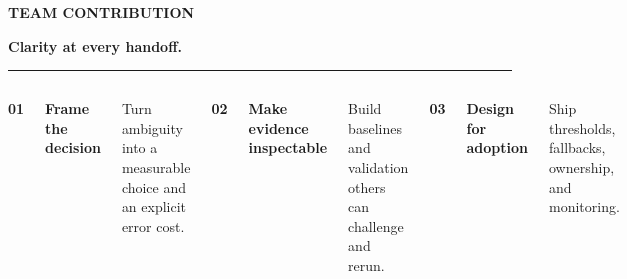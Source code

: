 \documentclass[aspectratio=169,11pt]{beamer}
\newcommand{\eyebrow}[1]{%
  {\fontsize{10}{12}\selectfont\bfseries\color{Leaf}\MakeUppercase{#1}\par}%
}
\newcommand{\slidetitle}[2]{%
  \eyebrow{#1}%
  \vspace{0.18cm}%
  {\fontsize{27}{29}\selectfont\bfseries\color{Ink}#2\par}%
  \vspace{0.12cm}%
  {\color{Mist}\rule{\textwidth}{0.65pt}}%
}
\newcommand{\smalltext}[1]{%
  {\fontsize{10.5}{13.5}\selectfont\color{Slate}#1\par}%
}
\begin{document}
\begin{frame}[t]
  \vspace{0.28cm}
  \slidetitle{Team contribution}{Clarity at every handoff.}
  \vspace{0.28cm}
  \begin{columns}[T,onlytextwidth]
      {\fontsize{23}{25}\selectfont\bfseries\color{Coral}01\par}
      \vspace{0.10cm}
      {\fontsize{16}{18}\selectfont\bfseries Frame the decision\par}
      \vspace{0.10cm}
      \smalltext{Turn ambiguity into a measurable choice and an explicit error cost.}
      \centering{\color{Mist}\rule{0.8pt}{2.80cm}}
      {\fontsize{23}{25}\selectfont\bfseries\color{Coral}02\par}
      \vspace{0.10cm}
      {\fontsize{16}{18}\selectfont\bfseries Make evidence inspectable\par}
      \vspace{0.10cm}
      \smalltext{Build baselines and validation others can challenge and rerun.}
      \centering{\color{Mist}\rule{0.8pt}{2.80cm}}
      {\fontsize{23}{25}\selectfont\bfseries\color{Coral}03\par}
      \vspace{0.10cm}
      {\fontsize{16}{18}\selectfont\bfseries Design for adoption\par}
      \vspace{0.10cm}
      \smalltext{Ship thresholds, fallbacks, ownership, and monitoring.}
  \end{columns}
\end{frame}
\end{document}
